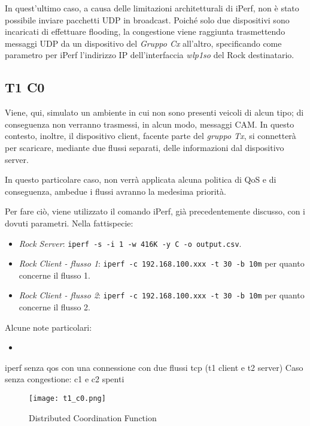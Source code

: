 In quest'ultimo caso, a causa delle limitazioni architetturali di iPerf, non è stato possibile inviare pacchetti UDP in broadcast. Poiché solo due dispositivi sono incaricati di effettuare flooding, la congestione viene raggiunta trasmettendo messaggi UDP da un dispositivo del \textit{Gruppo Cx} all'altro, specificando come parametro per iPerf l'indirizzo IP dell'interfaccia \textit{wlp1so} del Rock destinatario.

\subsection[T1 C1]{T1 C0}
Viene, qui, simulato un ambiente in cui non sono presenti veicoli di alcun tipo; di conseguenza non verranno trasmessi, in alcun modo, messaggi CAM. In questo contesto, inoltre, il dispositivo client, facente parte del \textit{gruppo Tx}, si connetterà per scaricare, mediante due flussi separati, delle informazioni dal dispositivo server.

In questo particolare caso, non verrà applicata alcuna politica di QoS e di conseguenza, ambedue i flussi avranno la medesima priorità.

Per fare ciò, viene utilizzato il comando iPerf, già precedentemente discusso, con i dovuti parametri. Nella fattispecie:

\begin{itemize}
    \item \textit{Rock Server}: \verb|iperf -s -i 1 -w 416K -y C -o output.csv|.
    \item \textit{Rock Client - flusso 1}: \verb|iperf -c 192.168.100.xxx -t 30 -b 10m| per quanto concerne il flusso 1.
    \item \textit{Rock Client - flusso 2}: \verb|iperf -c 192.168.100.xxx -t 30 -b 10m| per quanto concerne il flusso 2.
\end{itemize}

Alcune note particolari:

\begin{itemize}
    \item 
\end{itemize}

iperf senza qos con una connessione con due flussi tcp (t1 client e t2 server)
Caso senza congestione: c1 e c2 spenti

\begin{figure}[h!]
    \centering
    \texttt{[image: t1\_c0.png]}
    \caption{Distributed Coordination Function}
    \label{fig:t1_c0}
\end{figure}

